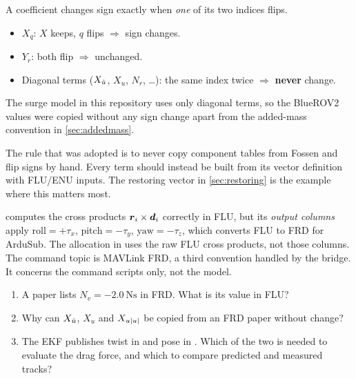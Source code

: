 \begin{keyidea}
A coefficient changes sign exactly when \emph{one} of its two indices flips.
\begin{itemize}[nosep]
  \item $X_q$: $X$ keeps, $q$ flips $\Rightarrow$ sign changes.
  \item $Y_r$: both flip $\Rightarrow$ unchanged.
  \item Diagonal terms ($X_{\dot u}$, $X_u$, $N_r$, \dots): the same index twice $\Rightarrow$ \textbf{never} change.
\end{itemize}
The surge model in this repository uses only diagonal terms, so the BlueROV2 values were
copied without any sign change apart from the added-mass convention in \cref{sec:addedmass}.
\end{keyidea}

The rule that was adopted is to never copy component tables from Fossen and flip signs by hand.
Every term should instead be built from its vector definition with FLU/ENU inputs. The restoring
vector in \cref{sec:restoring} is the example where this matters most.

\begin{caution}
 computes the cross products $\boldsymbol{r}_i\times\boldsymbol{d}_i$
correctly in FLU, but its \emph{output columns} apply $\text{roll}=+\tau_x$,
$\text{pitch}=-\tau_y$, $\text{yaw}=-\tau_z$, which converts FLU to FRD for ArduSub. The
allocation in  uses the raw FLU cross products, not those columns. The
command topic  is MAVLink FRD, a third convention handled
by the bridge. It concerns the command scripts only, not the model.
\end{caution}

\begin{questions}
\begin{enumerate}
  \item A paper lists $N_v = \qty{-2.0}{\newton\second}$ in FRD. What is its value in FLU?
  \item Why can $X_{\dot u}$, $X_u$ and $X_{u|u|}$ be copied from an FRD paper without change?
  \item The EKF publishes twist in  and pose in . Which of the two
        is needed to evaluate the drag force, and which to compare predicted and measured tracks?
\end{enumerate}
\end{questions}
